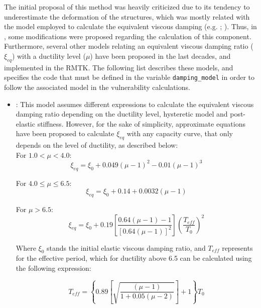 The initial proposal of this method was heavily criticized due to its tendency to underestimate the deformation of the structures, which was mostly related with the model employed to calculate the equivalent viscous damping (e.g. \cite{Fajfar1999}; \cite{ChopraGoel2010}). Thus, in \cite{FEMA4402005}, some modifications were proposed regarding the calculation of this component. Furthermore, several other models relating an equivalent viscous damping ratio ($\xi_{eq}$) with a ductility level ($\mu$) have been proposed in the last decades, and implemented in the RMTK. The following list describes these models, and specifies the code that must be defined in the variable \verb=damping_model= in order to follow the associated model in the vulnerability calculations.\\

\begin{itemize}
\item \cite{FEMA4402005}: This model assumes different expressions to calculate the equivalent viscous damping ratio depending on the ductility level, hysteretic model and post-elastic stiffness. However, for the sake of simplicity, approximate equations have been proposed to calculate $\xi_{eq}$ with any capacity curve, that only depends on the level of ductility, as described below:\\

For $1.0 < \mu < 4.0$:
\begin{equation}
	\xi_{eq} = \xi_0 + 0.049\left(\mu-1\right)^2-0.01\left(\mu-1\right)^3
\end{equation}

For $4.0 \le \mu \le 6.5$:
\begin{equation}
	\xi_{eq} = \xi_0 + 0.14 + 0.0032 \left(\mu-1\right)
\end{equation}

For $ \mu > 6.5$:
\begin{equation}
	\xi_{eq} = \xi_0 + 0.19\left[\frac{0.64\left(\mu-1\right)-1}{\left[0.64\left(\mu-1\right)\right]^2}\right]\left(\frac{T_{eff}}{T_0}\right)^2
\end{equation}

Where $\xi_0$ stands the initial elastic viscous damping ratio, and $T_{eff}$ represents for the effective period, which for ductility above 6.5 can be calculated using the following expression:

\begin{equation}
	T_{eff} = \left\{0.89\left[\sqrt{\frac{(\mu-1)}{1+0.05(\mu-2)}}\right]+1\right\}T_0
\end{equation}


\end{itemize}
